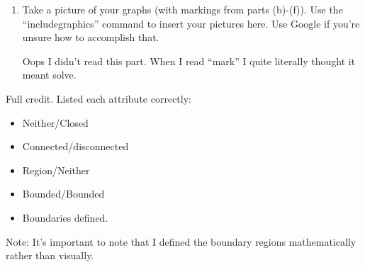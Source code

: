 \begin{enumerate}
\begin{enumerate}
\begin{problem}
\begin{align*}
				\tan^{-1}\cpr{\frac{(2.25-4)}{2.96825 - 2}} &= -0.5327172946\\
				\pi + 0.5327172946 &= 3.6743099482
			\end{align*}
			Thus, we have that the boundary points for this region are given by the union of the codomains of each of the following functions:
			\begin{align*}
				f(\theta) = e^{i\theta} + 2 + 2i, \quad \theta\in\,\approx[0.25, 2.89]\\
				g(\theta) = 2e^{i\theta} + 2 + 4i,\quad\theta\in\,\approx[3.67, 5.75]
			\end{align*}
			The next set is significantly easier. It is given by the union of the codomains of the following functions and $\{1\}$:
			\begin{align*}
				f(z) = |z-1| =1, \quad z\in\C\\
				g(z) = |z-1| = 2, \quad z\in\C
			\end{align*}
		\end{problem}
		\pagebreak
		\item  Take a picture of your graphs (with markings from parts (b)-(f)). Use the ``includegraphics'' command to insert your pictures here. Use Google if you're unsure how to accomplish that. 
		\begin{problem}
			Oops I didn't read this part. When I read ``mark'' I quite literally thought it meant solve. 
		\end{problem}
	\end{enumerate}
	\begin{grade}
		Full credit. Listed each attribute correctly:
		\begin{itemize}[itemsep=0pt, parsep=0pt]
			\item Neither/Closed
			\item Connected/disconnected
			\item Region/Neither
			\item Bounded/Bounded
			\item Boundaries defined. 
		\end{itemize}
		Note: It's important to note that I defined the boundary regions mathematically rather than visually. 
	\end{grade}
	

\end{enumerate}
